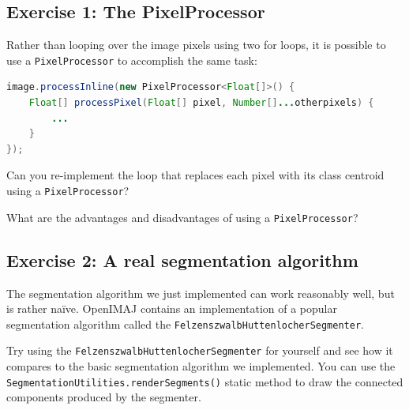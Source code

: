 \subsection*{Exercise 1: The PixelProcessor}
Rather than looping over the image pixels using two for loops, it is possible to use a 
\verb+PixelProcessor+ to accomplish the same task:
\begin{lstlisting}[language=java]
image.processInline(new PixelProcessor<Float[]>() {
    Float[] processPixel(Float[] pixel, Number[]...otherpixels) {
        ...
    }
});
\end{lstlisting}
Can you re-implement the loop that replaces each pixel with its class centroid 
using a \verb+PixelProcessor+? 

What are the advantages and disadvantages of using a \verb+PixelProcessor+?

\subsection*{Exercise 2: A real segmentation algorithm}
The segmentation algorithm we just implemented can work reasonably well, but is rather na\"ive. OpenIMAJ contains an 
implementation of a popular segmentation algorithm called the \verb+FelzenszwalbHuttenlocherSegmenter+. 

Try using the \verb+FelzenszwalbHuttenlocherSegmenter+ for yourself and see how it compares to the 
basic segmentation algorithm we implemented. You can use the \verb+SegmentationUtilities.renderSegments()+ 
static method to draw the connected components produced by the segmenter.

